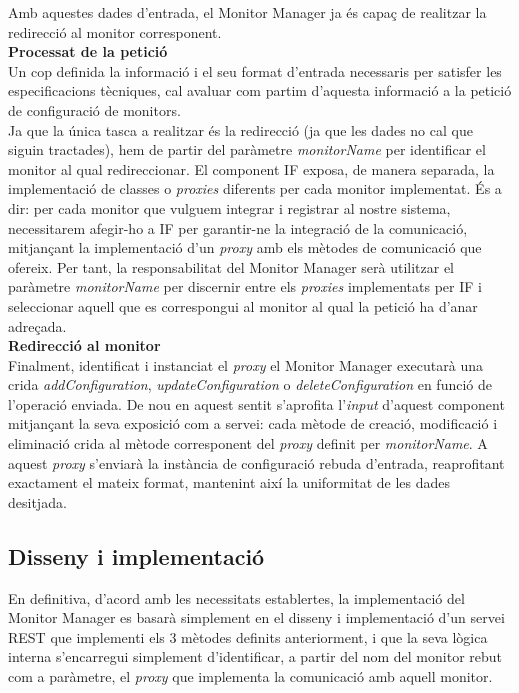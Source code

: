 Amb aquestes dades d'entrada, el Monitor Manager ja és capaç de realitzar la redirecció al monitor corresponent.\\

\noindent \textbf{\large Processat de la petició}\\

\noindent Un cop definida la informació i el seu format d'entrada necessaris per satisfer les especificacions tècniques, cal avaluar com partim d'aquesta informació a la petició de configuració de monitors.\\

Ja que la única tasca a realitzar és la redirecció (ja que les dades no cal que siguin tractades), hem de partir del paràmetre \textit{monitorName} per identificar el monitor al qual redireccionar. El component IF exposa, de manera separada, la implementació de classes o \textit{proxies} diferents per cada monitor implementat. És a dir: per cada monitor que vulguem integrar i registrar al nostre sistema, necessitarem afegir-ho a IF per garantir-ne la integració de la comunicació, mitjançant la implementació d'un \textit{proxy} amb els mètodes de comunicació que ofereix. Per tant, la responsabilitat del Monitor Manager serà utilitzar el paràmetre \textit{monitorName} per discernir entre els \textit{proxies} implementats per IF i seleccionar aquell que es correspongui al monitor al qual la petició ha d'anar adreçada. \\

\noindent \textbf{\large Redirecció al monitor}\\

\noindent Finalment, identificat i instanciat el \textit{proxy} el Monitor Manager executarà una crida \textit{addConfiguration}, \textit{updateConfiguration} o \textit{deleteConfiguration} en funció de l'operació enviada. De nou en aquest sentit s'aprofita l'\textit{input} d'aquest component mitjançant la seva exposició com a servei: cada mètode de creació, modificació i eliminació crida al mètode corresponent del \textit{proxy} definit per \textit{monitorName}. A aquest \textit{proxy} s'enviarà la instància de configuració rebuda d'entrada, reaprofitant exactament el mateix format, mantenint així la uniformitat de les dades desitjada.

\subsection{Disseny i implementació}

En definitiva, d'acord amb les necessitats establertes, la implementació del Monitor Manager es basarà simplement en el disseny i implementació d'un servei REST que implementi els 3 mètodes definits anteriorment, i que la seva lògica interna s'encarregui simplement d'identificar, a partir del nom del monitor rebut com a paràmetre, el \textit{proxy} que implementa la comunicació amb aquell monitor.\\


